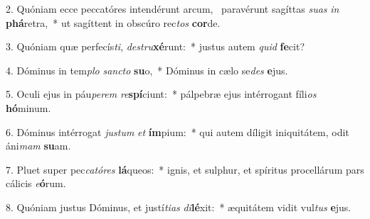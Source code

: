 2. Quóniam ecce peccatóres intendérunt arcum, \dag\  paravérunt sagíttas \textit{su}\textit{as} \textit{in} \textbf{phá}retra,~*  ut sagíttent in obscúro rec\textit{tos} \textbf{cor}de.\

3. Quóniam quæ perfecís\textit{ti}, \textit{de}\textit{stru}\textbf{xé}runt:~*  justus autem \textit{quid} \textbf{fe}cit?\

4. Dóminus in tem\textit{plo} \textit{sanc}\textit{to} \textbf{su}o,~*  Dóminus in cælo se\textit{des} \textbf{e}jus.\

5. Oculi ejus in páu\textit{pe}\textit{rem} \textit{re}\textbf{spí}ciunt:~*  pálpebræ ejus intérrogant fíli\textit{os} \textbf{hó}minum.\

6. Dóminus intérrogat \textit{jus}\textit{tum} \textit{et} \textbf{ím}pium:~*  qui autem díligit iniquitátem, odit áni\textit{mam} \textbf{su}am.\

7. Pluet super pec\textit{ca}\textit{tó}\textit{res} \textbf{lá}queos:~*  ignis, et sulphur, et spíritus procellárum pars cálicis \textit{e}\textbf{ó}rum.\

8. Quóniam justus Dóminus, et justí\textit{ti}\textit{as} \textit{di}\textbf{lé}xit:~*  æquitátem vidit vul\textit{tus} \textbf{e}jus.\

